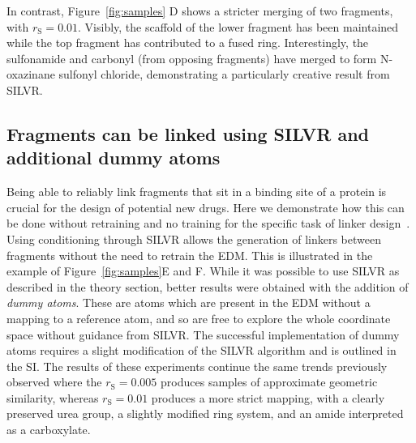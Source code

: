 \documentclass[journal=jacsat,manuscript=article]{achemso}
\begin{document}
In contrast, Figure~\ref{fig:samples} D shows a stricter merging of two fragments, with $r_{\mathrm{S}}=0.01$. Visibly, the scaffold of the lower fragment has been maintained while the top fragment has contributed to a fused ring. Interestingly, the sulfonamide and carbonyl (from opposing fragments) have merged to form N-oxazinane sulfonyl chloride, demonstrating a particularly creative result from SILVR. 

\subsection{Fragments can be linked using SILVR and additional dummy atoms}
\label{sec:linker}
Being able to reliably link fragments that sit in a binding site of a protein is crucial for the design of potential new drugs. Here we demonstrate how this can be done  without retraining and no training for the specific task of linker design~\cite{huang20223dlinker,imrie2020deep}. Using conditioning through SILVR allows the generation of linkers between fragments without the need to retrain the EDM. This is illustrated in the example of Figure~\ref{fig:samples}E and F. While it was possible to use SILVR as described in the theory section, better results were obtained with the addition of \textit{dummy atoms}. These are atoms which are present in the EDM without a mapping to a reference atom, and so are free to explore the whole coordinate space without guidance from SILVR. The successful implementation of dummy atoms requires a slight modification of the SILVR algorithm and is outlined in the SI. The results of these experiments continue the same trends previously observed where the $r_{\mathrm{S}}=0.005$ produces samples of approximate geometric similarity, whereas $r_{\mathrm{S}}=0.01$ produces a more strict mapping, with a clearly preserved urea group, a slightly modified ring system, and an amide interpreted as a carboxylate.

\end{document}
